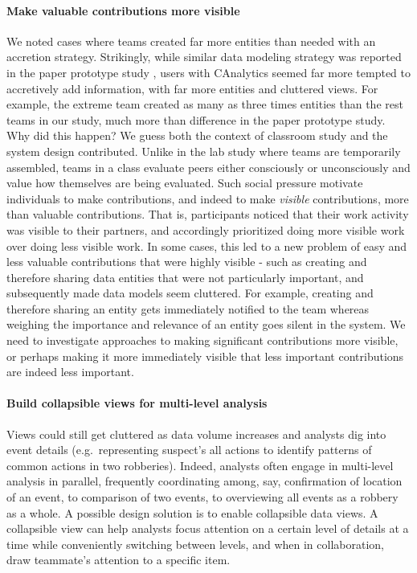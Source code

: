 \paragraph{Make valuable contributions more visible}
We noted cases where teams created far more entities than needed
with an accretion strategy. 
Strikingly, while similar data modeling strategy was reported in the paper prototype
study \cite{Carroll2013}, users with CAnalytics seemed far more
tempted to accretively add information, with far more entities and
cluttered views. For example, the extreme team created as many as three times entities than the rest teams in our study, much more than difference in the paper prototype study. Why did this
happen? We guess both the context of classroom study and the system
design contributed. Unlike in the lab study where teams are temporarily
assembled, teams in a class evaluate peers either consciously or
unconsciously and value how themselves are being evaluated. Such social
pressure motivate individuals to make contributions, and indeed to make
\emph{visible} contributions, more than valuable contributions. That is,
participants noticed that their work activity was visible to their
partners, and accordingly prioritized doing more visible work over doing
less visible work. In some cases, this led to a new problem of easy and
less valuable contributions that were highly visible - such as creating
and therefore sharing data entities that were not particularly
important, and subsequently made data models seem cluttered. For
example, creating and therefore sharing an entity gets immediately
notified to the team whereas weighing the importance and relevance of an
entity goes silent in the system. We need to investigate approaches to
making significant contributions more visible, or perhaps making it more
immediately visible that less important contributions are indeed less
important.

\paragraph{Build collapsible views for multi-level analysis}

Views could still get cluttered as data volume increases and analysts
dig into event details (e.g.~representing suspect's all actions to
identify patterns of common actions in two robberies). Indeed, analysts
often engage in multi-level analysis in parallel, frequently
coordinating among, say, confirmation of location of an event, to
comparison of two events, to overviewing all events as a robbery as a
whole. A possible design solution is to enable collapsible data views. A
collapsible view can help analysts focus attention on a certain level of
details at a time while conveniently switching between levels, and when
in collaboration, draw teammate's attention to a specific item.


